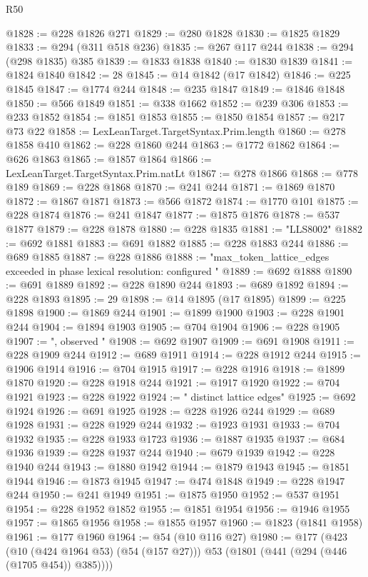 \begin{lexlean}{R50}
\begin{coremodule}
@1828 := @228 @1826 @271
@1829 := @280 @1828
@1830 := @1825 @1829
@1833 := @294 (@311 @518 @236)
@1835 := @267 @117 @244
@1838 := @294 (@298 @1835) @385
@1839 := @1833 @1838
@1840 := @1830 @1839
@1841 := @1824 @1840
@1842 := 28
@1845 := @14 @1842 (@17 @1842)
@1846 := @225 @1845
@1847 := @1774 @244
@1848 := @235 @1847
@1849 := @1846 @1848
@1850 := @566 @1849
@1851 := @338 @1662
@1852 := @239 @306
@1853 := @233 @1852
@1854 := @1851 @1853
@1855 := @1850 @1854
@1857 := @217 @73 @22
@1858 := LexLeanTarget.TargetSyntax.Prim.length
@1860 := @278 @1858 @410
@1862 := @228 @1860 @244
@1863 := @1772 @1862
@1864 := @626 @1863
@1865 := @1857 @1864
@1866 := LexLeanTarget.TargetSyntax.Prim.natLt
@1867 := @278 @1866
@1868 := @778 @189
@1869 := @228 @1868
@1870 := @241 @244
@1871 := @1869 @1870
@1872 := @1867 @1871
@1873 := @566 @1872
@1874 := @1770 @101
@1875 := @228 @1874
@1876 := @241 @1847
@1877 := @1875 @1876
@1878 := @537 @1877
@1879 := @228 @1878
@1880 := @228 @1835
@1881 := "LLS8002"
@1882 := @692 @1881
@1883 := @691 @1882
@1885 := @228 @1883 @244
@1886 := @689 @1885
@1887 := @228 @1886
@1888 := "max_token_lattice_edges exceeded in phase lexical resolution: configured "
@1889 := @692 @1888
@1890 := @691 @1889
@1892 := @228 @1890 @244
@1893 := @689 @1892
@1894 := @228 @1893
@1895 := 29
@1898 := @14 @1895 (@17 @1895)
@1899 := @225 @1898
@1900 := @1869 @244
@1901 := @1899 @1900
@1903 := @228 @1901 @244
@1904 := @1894 @1903
@1905 := @704 @1904
@1906 := @228 @1905
@1907 := ", observed "
@1908 := @692 @1907
@1909 := @691 @1908
@1911 := @228 @1909 @244
@1912 := @689 @1911
@1914 := @228 @1912 @244
@1915 := @1906 @1914
@1916 := @704 @1915
@1917 := @228 @1916
@1918 := @1899 @1870
@1920 := @228 @1918 @244
@1921 := @1917 @1920
@1922 := @704 @1921
@1923 := @228 @1922
@1924 := " distinct lattice edges"
@1925 := @692 @1924
@1926 := @691 @1925
@1928 := @228 @1926 @244
@1929 := @689 @1928
@1931 := @228 @1929 @244
@1932 := @1923 @1931
@1933 := @704 @1932
@1935 := @228 @1933 @1723
@1936 := @1887 @1935
@1937 := @684 @1936
@1939 := @228 @1937 @244
@1940 := @679 @1939
@1942 := @228 @1940 @244
@1943 := @1880 @1942
@1944 := @1879 @1943
@1945 := @1851 @1944
@1946 := @1873 @1945
@1947 := @474 @1848
@1949 := @228 @1947 @244
@1950 := @241 @1949
@1951 := @1875 @1950
@1952 := @537 @1951
@1954 := @228 @1952 @1852
@1955 := @1851 @1954
@1956 := @1946 @1955
@1957 := @1865 @1956
@1958 := @1855 @1957
@1960 := @1823 (@1841 @1958)
@1961 := @177 @1960
@1964 := @54 (@10 @116 @27)
@1980 := @177
    (@423
      (@10 (@424 @1964 @53) (@54 (@157 @27)))
      @53
      (@1801 (@441 (@294 (@446 (@1705 @454)) @385))))

\end{coremodule}
\end{lexlean}

